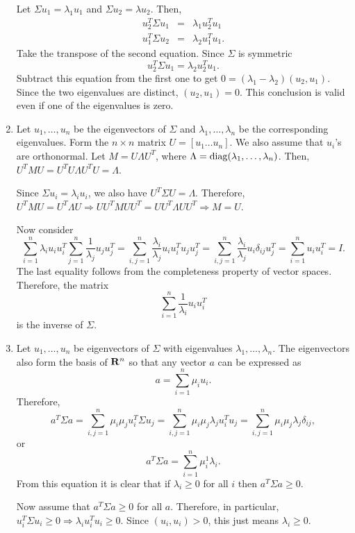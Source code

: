 \begin{enumerate}
Let $\Sigma u_1 = \lambda_1 u_1$ and $\Sigma u_2 = \lambda u_2$. Then,
\begin{eqnarray*}
u_2^T\Sigma u_1 &=& \lambda_1 u_2^T u_1 \\
u_1^T\Sigma u_2 &=& \lambda_2 u_1^T u_1.
\end{eqnarray*}
Take the transpose of the second equation. Since $\Sigma$ is symmetric
\[
u_2^T\Sigma u_1 = \lambda_2 u_2^T u_1.
\]
Subtract this equation from the first one to get $0 = (\lambda_1 - \lambda_2)(u_2, u_1)$. Since the 
two eigenvalues are distinct, $(u_2, u_1) = 0$. This conclusion is valid even if one of the eigenvalues
is zero.

\item Let $u_1, \ldots, u_n$ be the eigenvectors of $\Sigma$ and $\lambda_1, \ldots, \lambda_n$ be
the corresponding eigenvalues. Form the $n \times n$ matrix $U = [u_1 \ldots u_n]$. We also assume
that $u_i$'s are orthonormal. Let $M = U\Lambda U^T$, where $\Lambda = \operatorname{diag}(\lambda_1, \ldots,
\lambda_n)$. Then, $U^TM U = U^TU \Lambda U^TU = \Lambda$.

Since $\Sigma u_i = \lambda_i u_i$, we also have $U^T\Sigma U = \Lambda$. Therefore, $U^T M U = U^T \Lambda U
\Rightarrow UU^T M UU^T = UU^T \Lambda UU^T \Rightarrow M = U$.

Now consider 
\[
\sum_{i=1}^n \lambda_i u_i u_i^T\sum_{j=1}^n\frac{1}{\lambda_j}u_j u_j^T =
\sum_{i,j=1}^n\frac{\lambda_i}{\lambda_j}u_i u_i^T u_j u_j^T =
\sum_{i,j=1}^n \frac{\lambda_i}{\lambda_j}u_i\delta_{ij}u_j^T = \sum_{i=1}^n u_iu_i^T = I.
\]
The last equality follows from the completeness property of vector spaces. Therefore, the
matrix
\[
\sum_{i=1}^n\frac{1}{\lambda_i}u_i u_i^T
\]
is the inverse of $\Sigma$.

\item Let $u_1, \dots, u_n$ be eigenvectors of $\Sigma$ with eigenvalues $\lambda_1, \ldots,
\lambda_n$. The eigenvectors also form the basis of $\mathbf{R}^n$ so that any vector $a$ can be
expressed as
\[
a = \sum_{i=1}^n \mu_i u_i.
\]
Therefore, 
\[
a^T\Sigma a = \sum_{i,j=1}^n \mu_i \mu_j u_i^T \Sigma u_j = \sum_{i,j=1}^n \mu_i\mu_j\lambda_j u_i^T u_j = \sum_{i,j=1}^n\mu_i\mu_j\lambda_j\delta_{ij},
\]
or
\[
a^T\Sigma a = \sum_{i=1}^n \mu_i^1\lambda_i.
\]
From this equation it is clear that if $\lambda_i \ge 0$ for all $i$ then $a^T\Sigma a \ge 0$.

Now assume that $a^T\Sigma a \ge 0$ for all $a$. Therefore, in particular, $u_i^T\Sigma u_i \ge 0
\Rightarrow \lambda_i u_i^T u_i \ge 0$. Since $(u_i, u_i) > 0$, this just means $\lambda_i \ge 0$.


\end{enumerate}
